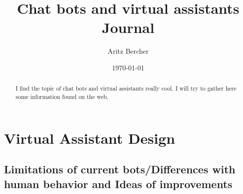 \documentclass[11pt,a4paper]{article}
\title{Chat bots and virtual assistants\\ Journal}
\author{Aritz Bercher}
\date{\today}
\begin{document}
\maketitle

\begin{abstract}
I find the topic of chat bots and virtual assistants really cool. I will try to gather here some information found on the web.
\end{abstract}

\section{Virtual Assistant Design}

\subsection{Limitations of current bots/Differences with human behavior and Ideas of improvements}
\end{document}
